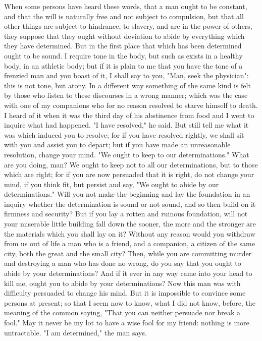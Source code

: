 \documentclass[a4paper]{article}
\begin{document}
    When some persons have heard these words, that a man ought to be constant,
and that the will is naturally free and not subject to compulsion, but that all
other things are subject to hindrance, to slavery, and are in the power of
others, they suppose that they ought without deviation to abide by everything
which they have determined. But in the first place that which has been
determined ought to be sound. I require tone in the body, but such as exists in
a healthy body, in an athletic body; but if it is plain to me that you have the
tone of a frenzied man and you boast of it, I shall say to you, "Man, seek the
physician": this is not tone, but atony. In a different way something of the
same kind is felt by those who listen to these discourses in a wrong manner;
which was the case with one of my companions who for no reason resolved to
starve himself to death. I heard of it when it was the third day of his
abstinence from food and I went to inquire what had happened. "I have
resolved," he said. But still tell me what it was which induced you to resolve;
for if you have resolved rightly, we shall sit with you and assist you to
depart; but if you have made an unreasonable resolution, change your mind. "We
ought to keep to our determinations." What are you doing, man? We ought to keep
not to all our determinations, but to those which are right; for if you are now
persuaded that it is right, do not change your mind, if you think fit, but
persist and say, "We ought to abide by our determinations." Will you not make
the beginning and lay the foundation in an inquiry whether the determination is
sound or not sound, and so then build on it firmness and security? But if you
lay a rotten and ruinous foundation, will not your miserable little building
fall down the sooner, the more and the stronger are the materials which you
shall lay on it? Without any reason would you withdraw from us out of life a
man who is a friend, and a companion, a citizen of the same city, both the
great and the small city? Then, while you are committing murder and destroying
a man who has done no wrong, do you say that you ought to abide by your
determinations? And if it ever in any way came into your head to kill me, ought
you to abide by your determinations?
    Now this man was with difficulty persuaded to change his mind. But it is
impossible to convince some persons at present; so that I seem now to know,
what I did not know, before, the meaning of the common saying, "That you can
neither persuade nor break a fool." May it never be my lot to have a wise fool
for my friend: nothing is more untractable. "I am determined," the man says.
\end{document}
